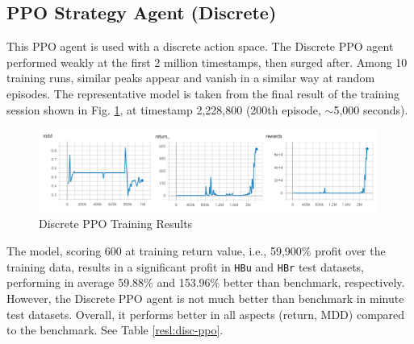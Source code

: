 \subsection{PPO Strategy Agent (Discrete)}
This PPO agent is used with a discrete action space. The Discrete PPO agent performed weakly at the first 2 million timestamps, then surged after. Among 10 training runs, similar peaks appear and vanish in a similar way at random episodes. The representative model is taken from the final result of the training session shown in Fig. \ref{gr:ppod:train}, at timestamp 2,228,800 (200th episode, $\sim$5,000 seconds).

\begin{figure}[H]
    \centering
    \includegraphics[width=0.99\textwidth]{graphics/trainphoto/ppodtrain.png}
    \caption{Discrete PPO Training Results}
    \label{gr:ppod:train}
\end{figure}

The model, scoring 600 at training return value, i.e., 59,900\% profit over the training data, results in a significant profit in \texttt{HBu} and \texttt{HBr} test datasets, performing in average 59.88\% and 153.96\% better than benchmark, respectively. However, the Discrete PPO agent is not much better than benchmark in minute test datasets. Overall, it performs better in all aspects (return, MDD) compared to the benchmark. See Table \ref{resl:disc-ppo}.

